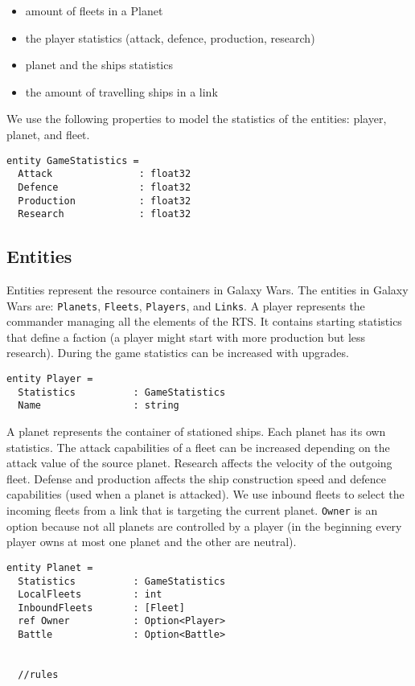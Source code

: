 \begin{itemize}[noitemsep]
\item amount of fleets in a Planet
\item the player statistics (attack, defence, production, research)
\item planet and the ships statistics
\item the amount of travelling ships in a link
\end{itemize}

\noindent
We use the following properties to model the statistics of the entities: player, planet, and fleet.

\begin{lstlisting}
entity GameStatistics =
  Attack               : float32
  Defence              : float32
  Production           : float32
  Research             : float32
\end{lstlisting}



\subsection{Entities}
Entities represent the resource containers in Galaxy Wars. The entities in Galaxy Wars are: \texttt{Planets}, \texttt{Fleets}, \texttt{Players}, and \texttt{Links}. A player represents the commander managing all the elements of the RTS. It contains starting statistics that define a faction (a player might start with more production but less research). During the game statistics can be increased with upgrades.

\begin{lstlisting}
entity Player =
  Statistics          : GameStatistics
  Name                : string
\end{lstlisting}

\noindent
A planet represents the container of stationed ships. Each planet has its own statistics. The attack capabilities of a fleet can be increased depending on the attack value of the source planet. Research affects the velocity of the outgoing fleet. Defense and production affects the ship construction speed and defence capabilities (used when a planet is attacked). We use inbound fleets to select the incoming fleets from a link that is targeting the current planet. \texttt{Owner} is an option because not all planets are controlled by a player (in the beginning every player owns at most one planet and the other are neutral).

\begin{lstlisting}
entity Planet =
  Statistics          : GameStatistics
  LocalFleets         : int
  InboundFleets       : [Fleet]
  ref Owner           : Option<Player>
  Battle              : Option<Battle>
  
  
  //rules
\end{lstlisting}


